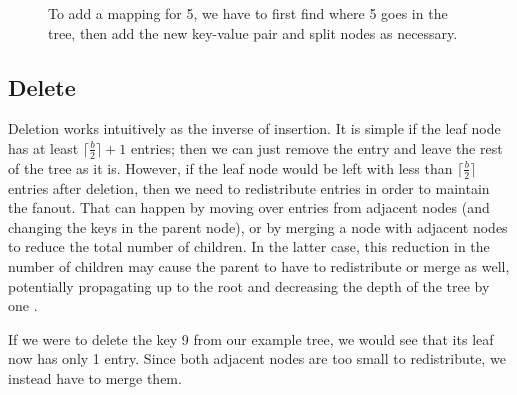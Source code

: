 \documentclass[12pt]{article}
\begin{document}
\begin{figure}[ht]
    \centering
    \caption{To add a mapping for 5, we have to first find where 5 goes in the tree, then add the new key-value pair and split nodes as necessary.}
    \label{fig:demotree3}
\end{figure}

\subsection{Delete}

Deletion works intuitively as the inverse of insertion. It is simple if the leaf node has at least $\lceil \frac{b}{2} \rceil + 1$ entries; then we can just remove the entry and leave the rest of the tree as it is. However, if the leaf node would be left with less than $\lceil \frac{b}{2} \rceil$ entries after deletion, then we need to redistribute entries in order to maintain the fanout. That can happen by moving over entries from adjacent nodes (and changing the keys in the parent node), or by merging a node with adjacent nodes to reduce the total number of children. In the latter case, this reduction in the number of children may cause the parent to have to redistribute or merge as well, potentially propagating up to the root and decreasing the depth of the tree by one \cite{elmasri_navathe_2011}.

If we were to delete the key 9 from our example tree, we would see that its leaf now has only 1 entry. Since both adjacent nodes are too small to redistribute, we instead have to merge them.
\end{document}
